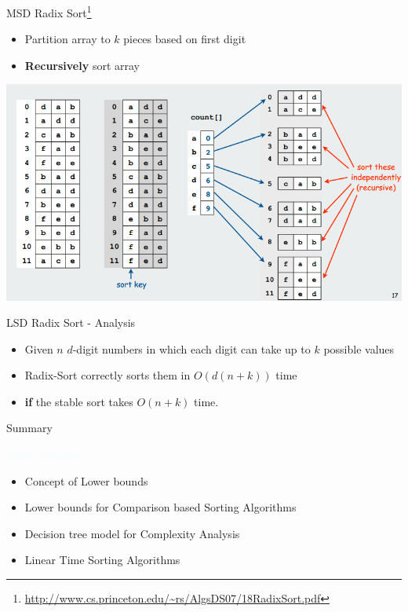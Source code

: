 \documentclass{beamer}
\newcommand{\tblue}[1]{{\Large {\textcolor{azure}{#1}}}}
\begin{document}
\begin{frame}{MSD Radix Sort\footnote{\url{http://www.cs.princeton.edu/~rs/AlgsDS07/18RadixSort.pdf}}}
\begin{itemize}
\item Partition array to $k$ pieces based on first digit
\item {\bf Recursively} sort array 
\end{itemize}
\begin{center}
    \includegraphics[scale=0.35]{msdRadixSortEg.png}
\end{center}
\end{frame}


\begin{frame}{LSD Radix Sort - Analysis}
\begin{itemize}
\item Given $n$ $d$-digit numbers in which each digit can take up to $k$ possible values
\item Radix-Sort correctly sorts them in $O( d(n+k) )$ time
\item {\bf if} the stable sort takes $O(n+k)$ time.
\end{itemize}
\end{frame}


\begin{frame}{Summary}

\tblue{Major Concepts:}
\begin{itemize}
\item Concept of Lower bounds
\item Lower bounds for Comparison based Sorting Algorithms
\item Decision tree model for Complexity Analysis
\item Linear Time Sorting Algorithms
\end{itemize}
\end{frame}
\end{document}
